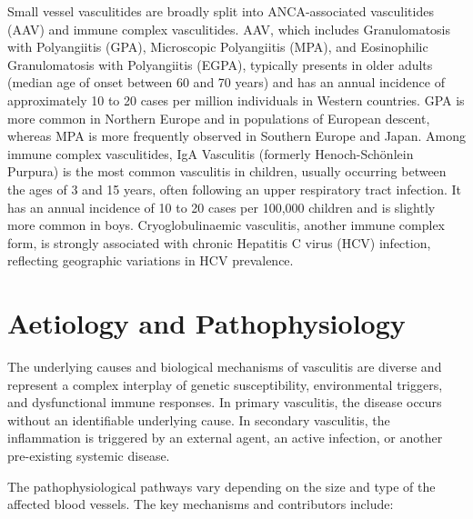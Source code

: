 Small vessel vasculitides are broadly split into ANCA-associated vasculitides (AAV) and immune complex vasculitides. AAV, which includes Granulomatosis with Polyangiitis (GPA), Microscopic Polyangiitis (MPA), and Eosinophilic Granulomatosis with Polyangiitis (EGPA), typically presents in older adults (median age of onset between 60 and 70 years) and has an annual incidence of approximately 10 to 20 cases per million individuals in Western countries. GPA is more common in Northern Europe and in populations of European descent, whereas MPA is more frequently observed in Southern Europe and Japan. Among immune complex vasculitides, IgA Vasculitis (formerly Henoch-Sch\"{o}nlein Purpura) is the most common vasculitis in children, usually occurring between the ages of 3 and 15 years, often following an upper respiratory tract infection. It has an annual incidence of 10 to 20 cases per 100,000 children and is slightly more common in boys. Cryoglobulinaemic vasculitis, another immune complex form, is strongly associated with chronic Hepatitis C virus (HCV) infection, reflecting geographic variations in HCV prevalence.

\section*{Aetiology and Pathophysiology}
The underlying causes and biological mechanisms of vasculitis are diverse and represent a complex interplay of genetic susceptibility, environmental triggers, and dysfunctional immune responses. In primary vasculitis, the disease occurs without an identifiable underlying cause. In secondary vasculitis, the inflammation is triggered by an external agent, an active infection, or another pre-existing systemic disease.

The pathophysiological pathways vary depending on the size and type of the affected blood vessels. The key mechanisms and contributors include:

